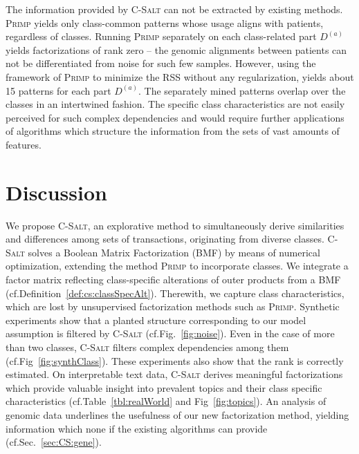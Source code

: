 The information provided by \textsc{C-Salt} can not be extracted by existing methods. \textsc{Primp} yields only class-common patterns whose usage aligns with patients, regardless of classes. Running \textsc{Primp} separately on each class-related part $D^{(a)}$ yields factorizations of rank zero -- the genomic alignments between patients can not be differentiated from noise for such few samples.  
However, using the framework of \textsc{Primp} to minimize the RSS without any regularization, yields about 15 patterns for each part $D^{(a)}$. The separately mined patterns overlap over the classes in an intertwined fashion. The specific class characteristics are not easily perceived for such complex dependencies and would require further applications of algorithms which structure the information from the sets of vast amounts of features.
\section{Discussion}
We propose \textsc{C-Salt}, an explorative method to simultaneously derive similarities and differences among sets of transactions, originating from diverse classes. \textsc{C-Salt} solves a Boolean Matrix Factorization (BMF) by means of numerical optimization, extending the method \textsc{Primp} to incorporate classes. We integrate a factor matrix reflecting class-specific alterations of outer products from a BMF (cf.\@ Definition~\ref{def:cs:classSpecAlt}). Therewith, we capture class characteristics, which are lost by unsupervised factorization methods such as \textsc{Primp}. Synthetic experiments show that a planted structure corresponding to our model assumption is filtered by \textsc{C-Salt} (cf.\@ Fig.~\ref{fig:noise}). Even in the case of more than two classes, \textsc{C-Salt} filters complex dependencies among them (cf.\@ Fig~\ref{fig:synthClass}). These experiments also show that the rank is correctly estimated. On interpretable text data, \textsc{C-Salt} derives meaningful factorizations which provide valuable insight into prevalent topics and their class specific characteristics (cf.\@ Table~\ref{tbl:realWorld} and Fig~\ref{fig:topics}). An analysis of genomic data underlines the usefulness of our new factorization method, yielding information which none if the existing algorithms can provide (cf.\@ Sec.~\ref{sec:CS:gene}).
